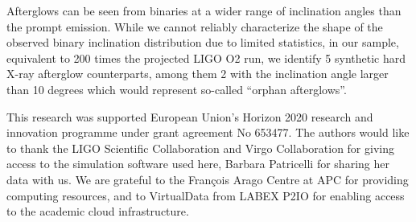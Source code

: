 \documentclass[11pt]{article}
\begin{document}

Afterglows can be seen from binaries at a wider range of inclination
angles than the prompt emission. While we cannot reliably characterize
the shape of the observed binary inclination distribution due to
limited statistics, in our sample, equivalent to 200 times the
projected LIGO O2 run, we identify 5 synthetic hard X-ray afterglow
counterparts, among them 2 with the inclination angle larger than 10
degrees which would represent so-called ``orphan afterglows''.

\vspace{3mm}


{\linespread{0.1} \footnotesize \noindent This research was supported
  European Union's Horizon 2020 research and innovation programme
  under grant agreement No 653477. The authors would like to thank the
  LIGO Scientific Collaboration and Virgo Collaboration for giving
  access to the simulation software used here, Barbara Patricelli for
  sharing her data with us. We are grateful to the Fran\c{c}ois Arago
  Centre at APC for providing computing resources, and to VirtualData
  from LABEX P2IO for enabling access to the academic cloud infrastructure.}


\vspace*{-5mm}
{\footnotesize
}
\end{document}
